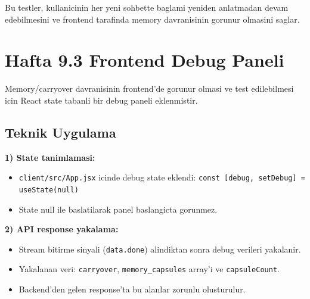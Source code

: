 \documentclass[11pt,a4paper]{article}
\begin{document}
Bu testler, kullanicinin her yeni sohbette baglami yeniden anlatmadan devam edebilmesini ve frontend tarafinda memory davranisinin gorunur olmasini saglar.

\section{Hafta 9.3 Frontend Debug Paneli}

Memory/carryover davranisinin frontend'de gorunur olmasi ve test edilebilmesi icin React state tabanli bir debug paneli eklenmistir.

\subsection{Teknik Uygulama}

\textbf{1) State tanimlamasi:}
\begin{itemize}[leftmargin=1.5em]
	\item \texttt{client/src/App.jsx} icinde debug state eklendi: \texttt{const [debug, setDebug] = useState(null)}
	\item State null ile baslatilarak panel baslangicta gorunmez.
\end{itemize}

\textbf{2) API response yakalama:}
\begin{itemize}[leftmargin=1.5em]
	\item Stream bitirme sinyali (\texttt{data.done}) alindiktan sonra debug verileri yakalanir.
	\item Yakalanan veri: \texttt{carryover}, \texttt{memory\_capsules} array'i ve \texttt{capsuleCount}.
	\item Backend'den gelen response'ta bu alanlar zorunlu olusturulur.
\end{itemize}
\end{document}
